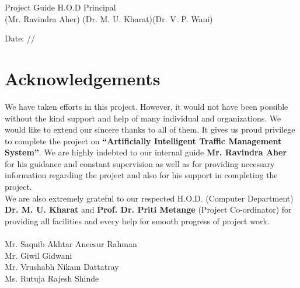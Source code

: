 \documentclass[openany,12pt]{report}
\begin{document}
	\hspace{0.1in} Project Guide  \hspace{1.5in}H.O.D \hspace{01.5in} Principal  \\
	\hspace{0.8in} (Mr. Ravindra Aher) \hspace{0.85in}(Dr. M. U. Kharat)\hspace{0.9in}(Dr. V. P. Wani)\\
	\vspace{0.2in}
	
	Date: \hspace{0.2 in}/\hspace{0.3 in}/   \\
	\newpage {}
	\chapter*{Acknowledgements}
	
	\hspace*{0.5 in}We have taken efforts in this project. However, it would not have been possible without the kind support and help of many individual and organizations. We would like to extend our sincere thanks to all of them. It gives us proud privilege to complete the project on \textbf{ ``Artificially Intelligent Traffic Management System''}. We are highly indebted to our internal guide \textbf{Mr. Ravindra Aher} for his guidance and constant supervision as well as for providing necessary information regarding the project and also for his support in completing the project.\\
	
	\hspace*{0.5 in}We are also extremely grateful to our respected H.O.D. (Computer Department) \textbf{Dr. M. U. Kharat} and \textbf{Prof. Dr. Priti Metange} (Project Co-ordinator) for providing all facilities and every help for smooth progress of project work.\\
	\\
	\hspace*{3.5 in}Mr. Saquib Akhtar Aneesur Rahman\\
	\hspace*{3.5 in}Mr. Giwil Gidwani \\
	\hspace*{3.5 in}Mr. Vrushabh Nikam Dattatray\\
	\hspace*{3.5 in}Ms. Rutuja Rajesh Shinde
	
\end{document}
